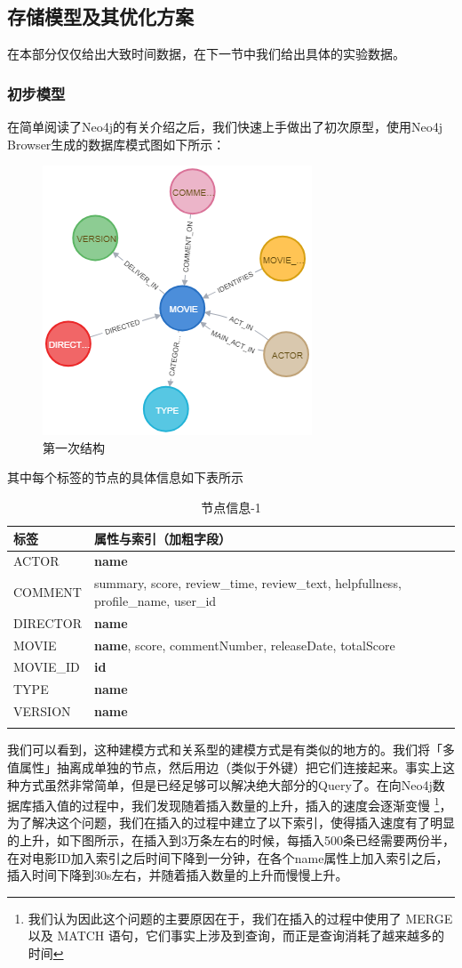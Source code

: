 \documentclass{ctexrep}
\begin{document}
	\subsection{存储模型及其优化方案}
	在本部分仅仅给出大致时间数据，在下一节中我们给出具体的实验数据。
	\subsubsection{初步模型} \label{neo:1}
	在简单阅读了Neo4j的有关介绍之后，我们快速上手做出了初次原型，使用Neo4j Browser生成的数据库模式图如下所示：
\begin{figure}[H]
	\centering
	\includegraphics[width=0.7\linewidth]{img/graph1}
	\caption{第一次结构}
	\label{fig:graph1}
\end{figure}
	其中每个标签的节点的具体信息如下表所示\begin{longtable}{l|p{8cm}}
		\hline
		标签 & 属性与索引（加粗字段） \\
		\hline
		\hline
		ACTOR & \textbf{name} \\
		COMMENT & summary, score, review\_time, review\_text, helpfullness, profile\_name, user\_id \\
		DIRECTOR & \textbf{name}\\
		MOVIE & \textbf{name}, score, commentNumber, releaseDate, totalScore \\
		MOVIE\_ID & \textbf{id} \\
		TYPE & \textbf{name}\\
		VERSION & \textbf{name}\\
		\hline
		\caption{节点信息-1}
	\end{longtable}
	我们可以看到，这种建模方式和关系型的建模方式是有类似的地方的。我们将「多值属性」抽离成单独的节点，然后用边（类似于外键）把它们连接起来。事实上这种方式虽然非常简单，但是已经足够可以解决绝大部分的Query了。在向Neo4j数据库插入值的过程中，我们发现随着插入数量的上升，插入的速度会逐渐变慢 \footnote{我们认为因此这个问题的主要原因在于，我们在插入的过程中使用了 MERGE 以及 MATCH 语句，它们事实上涉及到查询，而正是查询消耗了越来越多的时间}，为了解决这个问题，我们在插入的过程中建立了以下索引，使得插入速度有了明显的上升，如下图所示，在插入到3万条左右的时候，每插入500条已经需要两份半，在对电影ID加入索引之后时间下降到一分钟，在各个name属性上加入索引之后，插入时间下降到30s左右，并随着插入数量的上升而慢慢上升。
\end{document}
